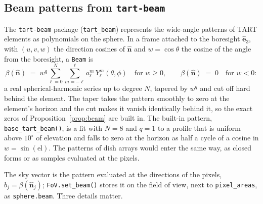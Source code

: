 \documentclass[11pt,a4paper]{article}
\begin{document}
\subsection{Beam patterns from \texttt{tart-beam}}
\label{sec:beammodels}

The \texttt{tart-beam} package (\texttt{tart\_beam}) \cite{tartbeam}
represents the wide-angle patterns of TART elements as polynomials on the
sphere. In a frame attached to the boresight $\hat{\boldsymbol{e}}_3$, with
$(u,v,w)$ the direction cosines of $\hat{\boldsymbol{n}}$ and $w=\cos\theta$
the cosine of the angle from the boresight, a \texttt{Beam} is
\begin{equation}
  \label{eq:tartbeam}
  \beta(\hat{\boldsymbol{n}}) \;=\; w^{q}\sum_{\ell=0}^{N}\sum_{m=-\ell}^{\ell}
    a_\ell^{m}\,Y_\ell^{m}(\theta,\phi)
  \quad\text{for } w\ge0,
  \qquad \beta(\hat{\boldsymbol{n}}) \;=\; 0
  \quad\text{for } w<0 :
\end{equation}
a real spherical-harmonic series up to degree $N$, tapered by $w^{q}$ and cut
off hard behind the element. The taper takes the pattern smoothly to zero at
the element's horizon and the cut makes it vanish identically behind it, so
the exact zeros of Proposition~\ref{prop:beam} are built in. The built-in
pattern, \texttt{base\_tart\_beam()}, is a fit with $N=8$ and $q=1$ to a
profile that is uniform above $10^{\circ}$ of elevation and falls to zero at
the horizon as half a cycle of a cosine in $w=\sin(\mathrm{el})$. The
patterns of dish arrays would enter the same way, as closed forms or as
samples evaluated at the pixels.

The sky vector is the pattern evaluated at the directions of the pixels,
$b_j=\beta(\hat{\boldsymbol{n}}_j)$; \texttt{FoV.set\_beam()} stores it on
the field of view, next to \texttt{pixel\_areas}, as \texttt{sphere.beam}.
Three details matter.
\end{document}
